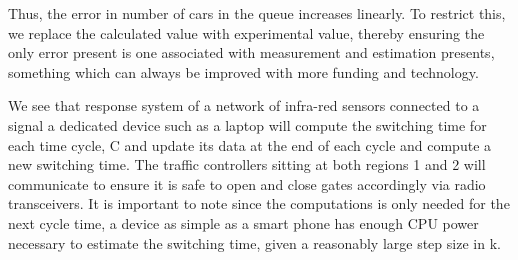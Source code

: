 \documentclass[a4paper]{article}
\begin{document}
Thus, the error in number of cars in the queue increases linearly. To restrict this, we replace the calculated value with experimental value, thereby ensuring the only error present is one associated with measurement and estimation presents, something which can always be improved with more funding and technology. 

We see that response system of a network of infra-red sensors connected to a signal a dedicated device such as a laptop will compute the switching time for each time cycle, C and update its data at the end of each cycle and compute a new switching time. The traffic controllers sitting at both regions 1 and 2 will communicate to ensure it is safe to open and close gates accordingly via radio transceivers. It is important to note since the computations is only needed for the next cycle time, a device as simple as a smart phone has enough CPU power necessary to estimate the switching time, given a reasonably large step size in k.
\end{document}
